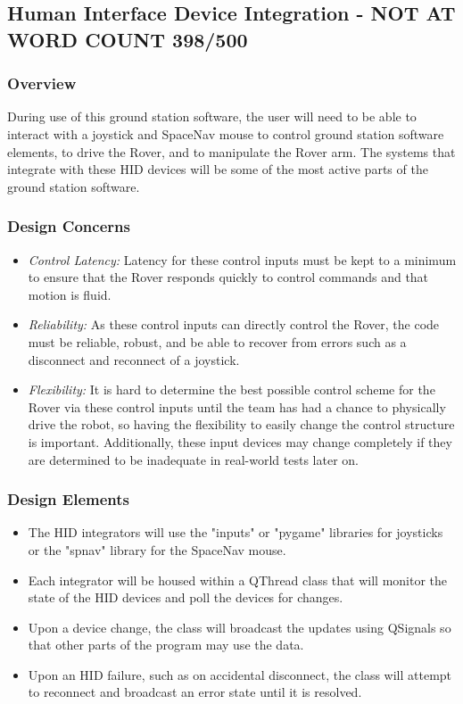\subsection{Human Interface Device Integration - NOT AT WORD COUNT 398/500}
\subsubsection{Overview}
During use of this ground station software, the user will need to be able to interact with a joystick and SpaceNav mouse to control ground station software elements, to drive the Rover, and to manipulate the Rover arm.
The systems that integrate with these HID devices will be some of the most active parts of the ground station software.

\subsubsection{Design Concerns}
\begin{itemize}
\item \textit{Control Latency:} Latency for these control inputs must be kept to a minimum to ensure that the Rover responds quickly to control commands and that motion is fluid.
\item \textit{Reliability:} As these control inputs can directly control the Rover, the code must be reliable, robust, and be able to recover from errors such as a disconnect and reconnect of a joystick.
\item \textit{Flexibility:} It is hard to determine the best possible control scheme for the Rover via these control inputs until the team has had a chance to physically drive the robot, so having the flexibility to easily change the control structure is important.
Additionally, these input devices may change completely if they are determined to be inadequate in real-world tests later on.
\end{itemize}

\subsubsection{Design Elements}
\begin{itemize}
\item The HID integrators will use the "inputs" or "pygame" libraries for joysticks or the "spnav" library for the SpaceNav mouse.
\item Each integrator will be housed within a QThread class that will monitor the state of the HID devices and poll the devices for changes.
\item Upon a device change, the class will broadcast the updates using QSignals so that other parts of the program may use the data.
\item Upon an HID failure, such as on accidental disconnect, the class will attempt to reconnect and broadcast an error state until it is resolved.
\end{itemize}

